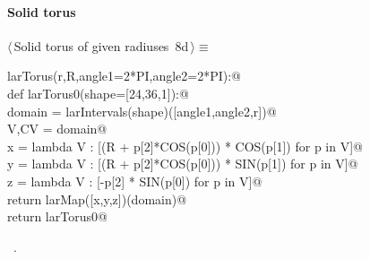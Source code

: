 \documentclass[11pt,oneside]{article}	%
\begin{document}
\paragraph{Solid torus}
\begin{flushleft} \small \label{scrap16}
\protect{}$\langle\,$Solid torus of given radiuses\nobreak\ {\footnotesize 8d}$\,\rangle\equiv$
\vspace{-1ex}
\begin{list}{}{} \item
\mbox{}\verb@def larTorus(r,R,angle1=2*PI,angle2=2*PI):@\\
\mbox{}\verb@   def larTorus0(shape=[24,36,1]):@\\
\mbox{}\verb@      domain = larIntervals(shape)([angle1,angle2,r])@\\
\mbox{}\verb@      V,CV = domain@\\
\mbox{}\verb@      x = lambda V : [(R + p[2]*COS(p[0])) * COS(p[1]) for p in V]@\\
\mbox{}\verb@      y = lambda V : [(R + p[2]*COS(p[0])) * SIN(p[1]) for p in V]@\\
\mbox{}\verb@      z = lambda V : [-p[2] * SIN(p[0]) for p in V]@\\
\mbox{}\verb@      return larMap([x,y,z])(domain)@\\
\mbox{}\verb@   return larTorus0@\\
\mbox{}\verb@@{\NWsep}
\end{list}
\vspace{-1ex}
\footnotesize\addtolength{\baselineskip}{-1ex}
\begin{list}{}{\setlength{\itemsep}{-\parsep}\setlength{\itemindent}{-\leftmargin}}
\item \NWtxtMacroRefIn\ .
\end{list}
\end{flushleft}
\end{document}
